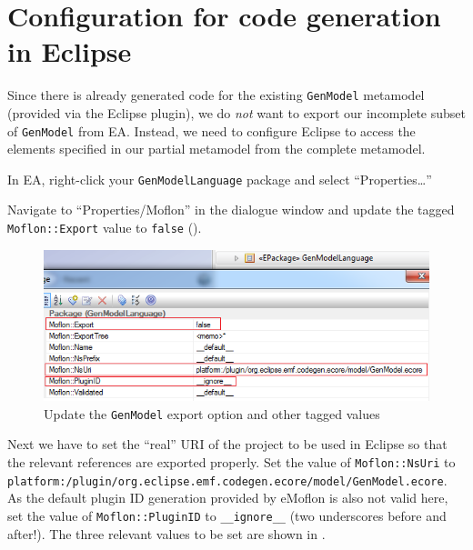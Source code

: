 \newpage

\section{Configuration for code generation in Eclipse}
\genHeader

Since there is already generated code for the existing \texttt{GenModel} metamodel (provided via the Eclipse plugin), we do \emph{not} want to export our
incomplete subset of \texttt{GenModel} from EA. Instead, we need to configure Eclipse to access the elements specified in our partial metamodel from the
complete metamodel.

\begin{stepbystep}

\item In EA, right-click your \texttt{GenModelLanguage} package and select ``Properties\ldots'' 

\item Navigate to ``Properties/Moflon'' in the dialogue window and update the tagged \texttt{Moflon::Export} value to \texttt{false}
().

\begin{figure}[htb]
\begin{center}  \includegraphics[width=\textwidth]{../../org.moflon.doc.handbook.05_miscellaneous/3_existingEMF/emfImages/ea_genModelExportFalse}
  \caption{Update the \texttt{GenModel} export option and other tagged values}  
  \label{fig_customNS}
\end{center}
\end{figure}

\item Next we have to set the ``real'' URI of the project to be used in Eclipse so that the relevant references are exported
properly. Set the value of \texttt{Moflon::NsUri} to \texttt{platform:/\-plugin/\-org.\-eclipse.\-emf.codegen.ecore/\-model/\-GenModel.ecore}.
As the default plugin ID generation provided by eMoflon is also not valid here, set the value of \texttt{Moflon::PluginID} to \texttt{\_\_ignore\_\_} (two underscores before and after!).
The three relevant values to be set are shown in .


\end{stepbystep}
